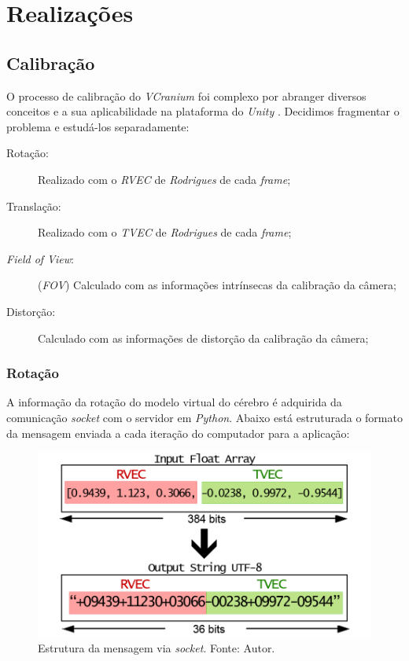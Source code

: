 \chapter{Realizações}\label{chp:realizacoes}

\section{Calibração}

O processo de calibração do \textit{VCranium} foi complexo por abranger diversos conceitos e a sua aplicabilidade na plataforma do \textit{Unity} \cite{UnityOficial}. Decidimos fragmentar o problema e estudá-los separadamente:

\begin{description}
    \item[Rotação:] Realizado com o \textit{RVEC} de \textit{Rodrigues} de cada \textit{frame};
    \item[Translação:] Realizado com o \textit{TVEC} de \textit{Rodrigues} de cada \textit{frame};
    \item[\textit{Field of View}:] (\textit{FOV}) Calculado com as informações intrínsecas da calibração da câmera;
    \item[Distorção:] Calculado com as informações de distorção da calibração da câmera;
\end{description}

\subsection{Rotação}

A informação da rotação do modelo virtual do cérebro é adquirida da comunicação \textit{socket} com o servidor em \textit{Python}. Abaixo está estruturada o formato da mensagem enviada a cada iteração do computador para a aplicação:

\begin{figure}[ht]
    \centering
    \includegraphics[width=.55\textwidth]{figuras/format rodrigues.png}
    \caption{Estrutura da mensagem via \textit{socket}. Fonte: Autor.}
    \label{fig:frodrigues}
\end{figure}

